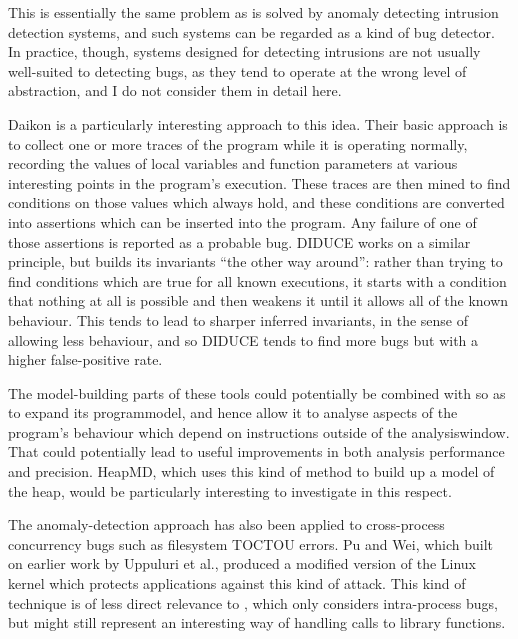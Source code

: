 This is essentially the same problem as is solved by anomaly detecting
intrusion detection systems\cite{Forrest1996a}, and such systems can
be regarded as a kind of bug detector.  In practice, though, systems
designed for detecting intrusions are not usually well-suited to
detecting bugs, as they tend to operate at the wrong level of
abstraction, and I do not consider them in detail here.

Daikon\cite{Ernst2007} is a particularly interesting approach to this
idea.  Their basic approach is to collect one or more traces of the
program while it is operating normally, recording the values of local
variables and function parameters at various interesting points in the
program's execution.  These traces are then mined to find conditions
on those values which always hold, and these conditions are converted
into assertions which can be inserted into the program.  Any failure
of one of those assertions is reported as a probable bug.
DIDUCE\cite{Hangal2002} works on a similar principle, but builds its
invariants ``the other way around'': rather than trying to find
conditions which are true for all known executions, it starts with a
condition that nothing at all is possible and then weakens it until it
allows all of the known behaviour.  This tends to lead to sharper
inferred invariants, in the sense of allowing less behaviour, and so
DIDUCE tends to find more bugs but with a higher false-positive rate.

The model-building parts of these tools could potentially be combined
with {\technique} so as to expand its \gls{programmodel}, and hence
allow it to analyse aspects of the program's behaviour which depend on
instructions outside of the \gls{analysiswindow}.  That could
potentially lead to useful improvements in both analysis performance
and precision.  HeapMD\cite{Chilimbi2006}, which uses this kind of
method to build up a model of the heap, would be particularly
interesting to investigate in this respect.

The anomaly-detection approach has also been applied to cross-process
concurrency bugs such as filesystem TOCTOU
errors\cite[pages~44--45]{Apple2012SecureCoding}.  Pu and
Wei\cite{Pu2006}, which built on earlier work by Uppuluri et
al.\cite{Uppuluri2005}, produced a modified version of the Linux
kernel which protects applications against this kind of attack.  This
kind of technique is of less direct relevance to {\technique}, which
only considers intra-process bugs, but might still represent an
interesting way of handling calls to library functions.

